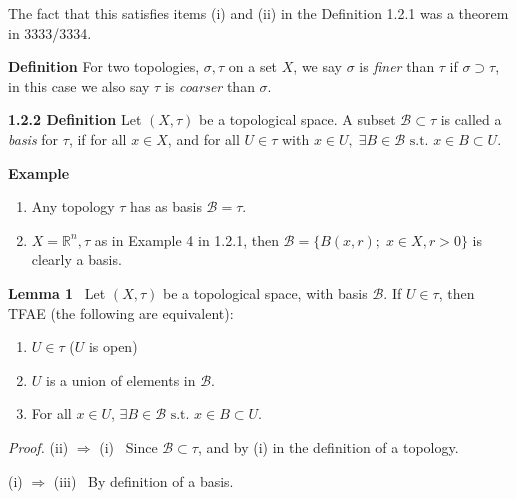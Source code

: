 \documentclass[12pt]{article}
\newcommand{\st}[0]{ \textrm{ s.t. } }
\newcommand{\rimply}[0] { \Rightarrow }
\newcommand{\reals}[0] { \mathbb{R}}
\newcommand{\B}[0] { \mathcal{B} }
\begin{document}
\begin{flushleft}
\begin{enumerate}[i]
         The fact that this satisfies items (i) and (ii) in the Definition
1.2.1 was a theorem in 3333/3334.
    \end{enumerate}\end{flushleft}\begin{flushleft} 
 { \bf Definition }For two topologies, $\sigma, \tau$ on a set $X$, we say $\sigma$ is {\em finer} 
than $\tau$ if $\sigma \supset \tau$, in this case we also say $\tau$ is {\em 
 coarser} than $\sigma$.\end{flushleft}\begin{flushleft} 
 { \bf 1.2.2 Definition }Let $(X, \tau)$ be a topological space. A subset $\B \subset \tau$ is called a {\em basis} for $\tau$, if for all $x \in X$, 
and for all $U \in \tau$ with $x \in  U, \; \exists B \in \B \st x \in B \subset U$.\end{flushleft}\begin{flushleft} 
 { \bf Example }\begin{enumerate}[i]
\item
              Any topology $\tau$ has as basis    $\B = \tau$.
            \item
                $X = \reals^n, \tau$ as in Example 4 in 1.2.1, then 
$\B = \{ B(x, r); \; x \in X, r>0 \}$ is clearly a basis.
            \end{enumerate}\end{flushleft}\begin{flushleft} 
 { \bf Lemma 1 } \  Let $(X, \tau)$ be a topological space, with basis $\B$. If $U \in \tau$, then TFAE (the following are equivalent):
\begin{enumerate}[i]
\item
                $U \in \tau$ ($U$ is open)
            \item
                $U$ is a union of elements in $\B$.
            \item
                For all $x \in U$, $\exists B \in \B \st x \in B \subset U$.
            \end{enumerate}\begin{flushleft} 
 \emph{Proof.  } (ii) $\rimply$ (i) \ Since $\B \subset \tau$, and by (i)
 in the definition of a topology.

  (i)  $\rimply$ (iii) \ By definition of a basis. 


\end{flushleft}
\end{flushleft}
\end{document}
